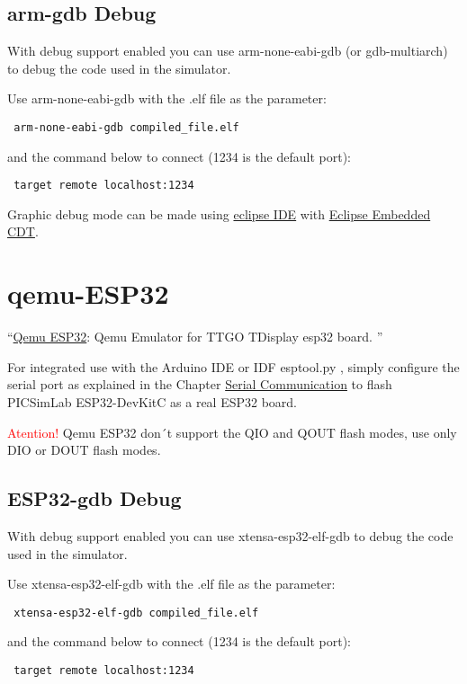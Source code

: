  \subsection{arm-gdb Debug} \hypertarget{def:gdbarm}{}
 
 With debug support enabled you can use arm-none-eabi-gdb (or gdb-multiarch) to debug the code used in the simulator. 
 
 Use arm-none-eabi-gdb with the .elf file as the parameter:
 \begin{verbatim}
 arm-none-eabi-gdb compiled_file.elf
 \end{verbatim}
 and the command below to connect (1234 is the default port):
 \begin{verbatim}
 target remote localhost:1234
 \end{verbatim}

Graphic debug mode can be made using \href{https://www.eclipse.org/}{eclipse IDE} with 
\href{https://projects.eclipse.org/projects/iot.embed-cdt}{Eclipse Embedded CDT}.

\section{qemu-ESP32} \hypertarget{def:qemu-esp32}{}
 ``\href{https://github.com/a159x36/qemu}{Qemu ESP32}: Qemu Emulator for TTGO TDisplay esp32 board. ''
  
For integrated use with the Arduino IDE or IDF esptool.py , simply configure the serial port as explained 
in the Chapter \hyperlink{def:seriali}{Serial Communication} to flash PICSimLab ESP32-DevKitC as a real ESP32 board.

 \textcolor{red}{Atention!} Qemu ESP32 don´t support the QIO and QOUT flash modes, use only DIO or DOUT flash modes. 
 
\subsection{ESP32-gdb Debug} \hypertarget{def:gdbesp}{}

 With debug support enabled you can use xtensa-esp32-elf-gdb to debug the code used in the simulator. 
 
 Use xtensa-esp32-elf-gdb with the .elf file as the parameter:
 \begin{verbatim}
 xtensa-esp32-elf-gdb compiled_file.elf
 \end{verbatim}
 and the command below to connect (1234 is the default port):
 \begin{verbatim}
 target remote localhost:1234
 \end{verbatim}

